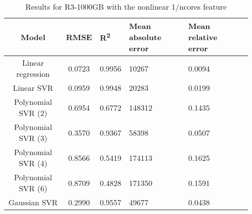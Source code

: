 \begin{table}[H]
\centering
\begin{adjustbox}{center}
\begin{tabular}{c | c M{1.2cm} M{2.5cm} M{2.5cm} M{1.8cm}}
Model & RMSE & R\textsuperscript{2} & Mean absolute error & Mean relative error \tabularnewline
\hline
Linear regression & 0.0723 & 0.9956 &  10267 & 0.0094 \\
Linear SVR & 0.0959 & 0.9948 &  20283 & 0.0199 \\
Polynomial SVR (2) & 0.6954 & 0.6772 & 148312 & 0.1435 \\
Polynomial SVR (3) & 0.3570 & 0.9367 &  58398 & 0.0507 \\
Polynomial SVR (4) & 0.8566 & 0.5419 & 174113 & 0.1625 \\
Polynomial SVR (6) & 0.8709 & 0.4828 & 171350 & 0.1591 \\
Gaussian SVR & 0.2990 & 0.9557 &  49677 & 0.0438 \\
\end{tabular}
\end{adjustbox}
\\
\caption{Results for R3-1000GB with the nonlinear 1/ncores feature}
\label{tab:all_nonlinear_R3_1000}
\end{table}
